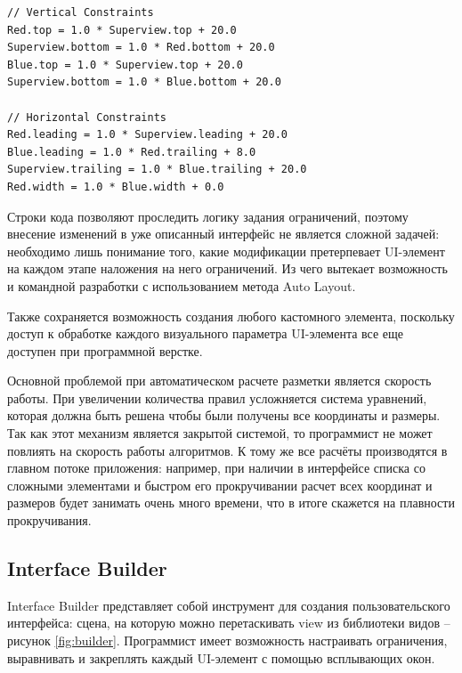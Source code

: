 \newpage

\begin{lstlisting}[label=lst:code3, caption=Задание параметров view]
// Vertical Constraints
Red.top = 1.0 * Superview.top + 20.0
Superview.bottom = 1.0 * Red.bottom + 20.0
Blue.top = 1.0 * Superview.top + 20.0
Superview.bottom = 1.0 * Blue.bottom + 20.0
 
// Horizontal Constraints
Red.leading = 1.0 * Superview.leading + 20.0
Blue.leading = 1.0 * Red.trailing + 8.0
Superview.trailing = 1.0 * Blue.trailing + 20.0
Red.width = 1.0 * Blue.width + 0.0
\end{lstlisting}

Строки кода позволяют проследить логику задания ограничений, поэтому внесение изменений в уже описанный интерфейс не является сложной задачей: необходимо лишь понимание того, какие модификации претерпевает UI-элемент на каждом этапе наложения на него ограничений. Из чего вытекает возможность и командной разработки с использованием метода Auto Layout.

Также сохраняется возможность создания любого кастомного элемента, поскольку доступ к обработке каждого визуального параметра UI-элемента все еще доступен при программной верстке.

Основной проблемой при автоматическом расчете разметки является скорость работы. При увеличении
количества правил усложняется система уравнений, которая должна быть решена чтобы были получены все координаты и размеры. Так как этот механизм является закрытой системой, то программист не может повлиять на скорость работы алгоритмов. К тому же все расчёты производятся в главном потоке приложения: например, при наличии в интерфейсе списка со сложными элементами и быстром его прокручивании расчет всех координат и размеров будет занимать очень много времени, что в итоге скажется на плавности прокручивания.


\subsection{Interface Builder}

Interface Builder \cite{interfacebuilder} представляет собой инструмент для создания пользовательского интерфейса: сцена, на которую можно перетаскивать view из библиотеки видов -- рисунок \ref{fig:builder}. 
Программист имеет возможность настраивать ограничения, выравнивать и закреплять каждый UI-элемент с помощью всплывающих окон. 

